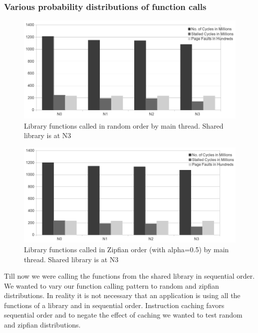 \subsubsection{Various probability distributions of function calls}

\begin{figure}
    \centering
    \includegraphics[scale=0.38]{randomDistribution.png}
    \caption{Library functions called in random order by main thread. Shared library is at N3 }
    \label{fig:randomDistribution}
\end{figure}

\begin{figure}
    \centering
    \includegraphics[scale=0.38]{zipfDistribution.png}
    \caption{Library functions called in Zipfian order (with alpha=0.5) by main thread. Shared library is at N3 }
    \label{fig:zipfDistribution}
\end{figure}

Till now we were calling the functions from the shared library in sequential order.
We wanted to vary our function calling pattern to random and zipfian distributions.
In reality it is not necessary that an application is using all the functions of a library and in sequential order.
Instruction caching favors sequential order and to negate the effect of caching we wanted to test random and zipfian distributions.

